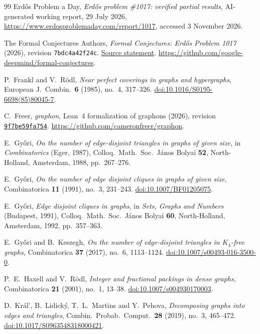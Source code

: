\documentclass[10pt]{article}
\theoremstyle{definition}
\theoremstyle{remark}
\numberwithin{equation}{section}
\begin{document}
\begin{thebibliography}{99}
Erd\H{o}s Problem a Day, \emph{Erd\H{o}s problem \#1017: verified partial results}, AI-generated working report, 29 July 2026, \url{https://www.erdosproblemaday.com/report/1017}, accessed 3 November 2026.

The Formal Conjectures Authors, \emph{Formal Conjectures: Erd\H{o}s Problem 1017} (2026), revision \texttt{7bdc4a42f24c}. \href{https://github.com/google-deepmind/formal-conjectures/blob/7bdc4a42f24c0316f81c73b26121794b2bed96a3/FormalConjectures/ErdosProblems/1017.lean}{Source statement}. \url{https://github.com/google-deepmind/formal-conjectures}.

P.~Frankl and V.~R\"odl, \emph{Near perfect coverings in graphs and hypergraphs}, European J.\ Combin.\ \textbf{6} (1985), no.~4, 317--326. \href{https://doi.org/10.1016/S0195-6698(85)80045-7}{doi:10.1016/S0195-6698(85)80045-7}.

C.~Freer, \emph{graphon}, Lean~4 formalization of graphons (2026), revision \href{https://github.com/cameronfreer/graphon/tree/9f7be59fa754d260a544b4cfd83d6a5b94f7552e}{\texttt{9f7be59fa754}}. \url{https://github.com/cameronfreer/graphon}.

E.~Gy\H{o}ri, \emph{On the number of edge-disjoint triangles in graphs of given size}, in \emph{Combinatorics} (Eger, 1987), Colloq.\ Math.\ Soc.\ J\'anos Bolyai \textbf{52}, North-Holland, Amsterdam, 1988, pp.~267--276.

E.~Gy\H{o}ri, \emph{On the number of edge disjoint cliques in graphs of given size}, Combinatorica \textbf{11} (1991), no.~3, 231--243. \href{https://doi.org/10.1007/BF01205075}{doi:10.1007/BF01205075}.

E.~Gy\H{o}ri, \emph{Edge disjoint cliques in graphs}, in \emph{Sets, Graphs and Numbers} (Budapest, 1991), Colloq.\ Math.\ Soc.\ J\'anos Bolyai \textbf{60}, North-Holland, Amsterdam, 1992, pp.~357--363.

E.~Gy\H{o}ri and B.~Keszegh, \emph{On the number of edge-disjoint triangles in $K_4$-free graphs}, Combinatorica \textbf{37} (2017), no.~6, 1113--1124. \href{https://doi.org/10.1007/s00493-016-3500-0}{doi:10.1007/s00493-016-3500-0}.

P.~E.~Haxell and V.~R\"odl, \emph{Integer and fractional packings in dense graphs}, Combinatorica \textbf{21} (2001), no.~1, 13--38. \href{https://doi.org/10.1007/s004930170003}{doi:10.1007/s004930170003}.

D.~Kr\'al', B.~Lidick\'y, T.~L.~Martins and Y.~Pehova, \emph{Decomposing graphs into edges and triangles}, Combin.\ Probab.\ Comput.\ \textbf{28} (2019), no.~3, 465--472. \href{https://doi.org/10.1017/S0963548318000421}{doi:10.1017/S0963548318000421}.


\end{thebibliography}
\end{document}
